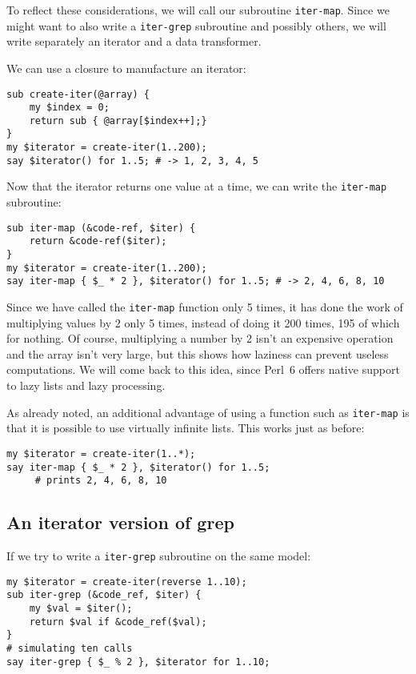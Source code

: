To reflect these considerations, we will call our subroutine 
{\tt iter-map}. Since we might want to also write a 
{\tt iter-grep} subroutine and possibly others, we will 
write separately an iterator and a data transformer.

We can use a closure to manufacture an iterator:

\begin{verbatim}
sub create-iter(@array) {
    my $index = 0;
    return sub { @array[$index++];}
}
my $iterator = create-iter(1..200);
say $iterator() for 1..5; # -> 1, 2, 3, 4, 5
\end{verbatim} 

Now that the iterator returns one value at a time, we 
can write the {\tt iter-map} subroutine:

\begin{verbatim}
sub iter-map (&code-ref, $iter) {
    return &code-ref($iter);
}
my $iterator = create-iter(1..200);
say iter-map { $_ * 2 }, $iterator() for 1..5; # -> 2, 4, 6, 8, 10
\end{verbatim}

Since we have called the {\tt iter-map} function only 5 times, 
it has done the work of multiplying values by 2 only 5 times, 
instead of doing it 200 times, 195 of which for nothing. 
Of course, multiplying a number by 2 isn't an expensive 
operation and the array isn't very large, but this shows 
how laziness can prevent useless computations. We will come 
back to this idea, since Perl~6 offers native support to lazy 
lists and lazy processing.

As already noted, an additional advantage of using a function 
such as {\tt iter-map} is that it is possible to use 
virtually infinite lists. This works just as before:

\begin{verbatim}
my $iterator = create-iter(1..*);
say iter-map { $_ * 2 }, $iterator() for 1..5;
     # prints 2, 4, 6, 8, 10
\end{verbatim}

\subsection{An iterator version of grep}

If we try to write a {\tt iter-grep} subroutine on the same 
model:

\begin{verbatim}
my $iterator = create-iter(reverse 1..10);
sub iter-grep (&code_ref, $iter) {
	my $val = $iter();
	return $val if &code_ref($val);
}
# simulating ten calls
say iter-grep { $_ % 2 }, $iterator for 1..10;
\end{verbatim}

